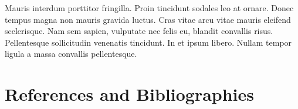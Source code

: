 \documentclass{article}
\begin{document}
Mauris interdum porttitor fringilla. Proin tincidunt sodales leo at ornare. Donec tempus magna non mauris gravida luctus. Cras vitae arcu vitae mauris eleifend scelerisque. Nam sem sapien, vulputate nec felis eu, blandit convallis risus. Pellentesque sollicitudin venenatis tincidunt. In et ipsum libero. Nullam tempor ligula a massa convallis pellentesque.


\section{References and Bibliographies}
\end{document}
